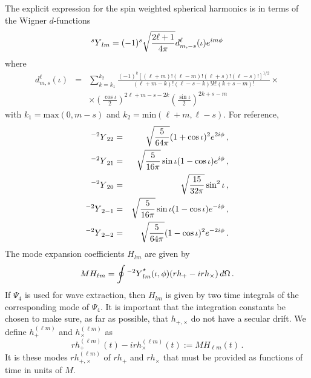 \documentclass[10pt]{ligodcc}
\begin{document}
The explicit expression for the spin weighted spherical harmonics is
in terms of the Wigner $d$-functions
\begin{equation}
  \label{eq:5}
   {{}^sY}_{lm} = (-1)^s\sqrt{\frac{2\ell+1}{4\pi}} d^\ell_{m,-s}(\iota)e^{im\phi}
\end{equation}
where
\begin{eqnarray}
  \label{eq:6}
  d^\ell_{m,s}(\iota) &=& \sum_{k = k_1}^{k_2}
    \frac{(-1)^k[(\ell+m)!(\ell-m)!(\ell+s)!(\ell-s)!]^{1/2}}{(\ell +m
      -k)!(\ell-s-k)!k!(k+s-m)!} \times \\ 
    &&\times \left(\frac{\cos\iota}{2}\right)^{2\ell+m-s-2k}\left(\frac{\sin\iota}{2}\right)^{2k+s-m}  
\end{eqnarray}
with $k_1 = \textrm{max}(0, m-s)$ and $k_2=\textrm{min}(\ell+m,
\ell-s)$.  For reference,
\begin{eqnarray}
  \label{eq:7}
  {{}^{-2}Y}_{22} &=& \sqrt{\frac{5}{64\pi}}(1+\cos\iota)^2e^{2i\phi} \,,\\
  {{}^{-2}Y}_{21} &=& \sqrt{\frac{5}{16\pi}}  \sin\iota( 1 - \cos\iota )e^{i\phi} \,,\\
  {{}^{-2}Y}_{20} &=& \sqrt{\frac{15}{32\pi}} \sin^2\iota \,,\\
  {{}^{-2}Y}_{2-1} &=& \sqrt{\frac{5}{16\pi}}  \sin\iota( 1 - \cos\iota
  )e^{-i\phi} \,,\\
  {{}^{-2}Y}_{2-2} &=& \sqrt{\frac{5}{64\pi}}(1-\cos\iota)^2e^{-2i\phi}\,.
\end{eqnarray}
The mode expansion coefficients $H_{lm}$ are given by
\begin{equation}
  \label{eq:10}
  MH_{\ell m} = \oint {{}^{-2}Y}_{lm}^\star(\iota,\phi)(rh_+-irh_\times )\,d\Omega\,.
\end{equation}
If $\Psi_4$ is used for wave extraction, then $H_{lm}$ is given by two
time integrals of the corresponding mode of $\Psi_4$.  It is important
that the integration constants be chosen to make sure, as far as
possible, that $h_{+,\times}$ do not have a secular drift. 
We define $h_+^{(\ell m)}$ and $h_\times^{(\ell m)}$ as
\begin{equation}
  \label{eq:11}
  rh_+^{(\ell m)}(t) -irh_\times^{(\ell m)}(t) := MH_{\ell m}(t)\,.  
\end{equation}
It is these modes $rh_{+,\times}^{(\ell m)}$ of $rh_+$ and $rh_\times$ that must be
provided as functions of time in units of $M$.
\end{document}
